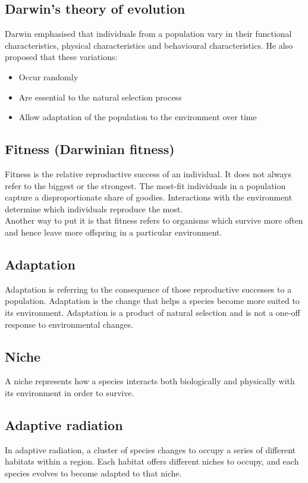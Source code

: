 \documentclass[11pt]{article}
\begin{document}
\subsection{Darwin's theory of evolution}
\label{sec:orge7a5126}
Darwin emphasised that individuals from a population vary in their functional characteristics, physical characteristics and behavioural characteristics. He also proposed that these variations:
\begin{itemize}
\item Occur randomly
\item Are essential to the natural selection process
\item Allow adaptation of the population to the environment over time
\end{itemize}

\subsection{Fitness (Darwinian fitness)}
\label{sec:org8649de9}
Fitness is the relative reproductive success of an individual. It does not always refer to the biggest or the strongest. The most-fit individuals in a population capture a disproportionate share of goodies. Interactions with the environment determine which individuals reproduce the most.
\\[0pt]

Another way to put it is that fitness refers to organisms which survive more often and hence leave more offspring in a particular environment.

\subsection{Adaptation}
\label{sec:org0bcd324}
Adaptation is referring to the consequence of those reproductive successes to a population. Adaptation is the change that helps a species become more suited to its environment. Adaptation is a product of natural selection and is not a one-off response to environmental changes.

\subsection{Niche}
\label{sec:orge180de7}
A niche represents how a species interacts both biologically and physically with its environment in order to survive.

\subsection{Adaptive radiation}
\label{sec:org660be7c}
In adaptive radiation, a cluster of species changes to occupy a series of different habitats within a region. Each habitat offers different niches to occupy, and each species evolves to become adapted to that niche.
\end{document}
